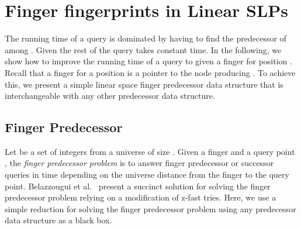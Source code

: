 \documentclass[11pt]{article}
\begin{document}
\section{Finger fingerprints in Linear SLPs}
The  running time of a  query is dominated by having to find the predecessor  of  among . Given  the rest of the query takes constant time. In the following, we show how to improve the running time of a  query to  given a finger for position .  Recall that a finger  for  a position  is a pointer to the node  producing .
To achieve this, we present a simple linear space finger predecessor data structure that is interchangeable with any other predecessor data structure.

\subsection{Finger Predecessor}
Let  be a set of  integers from a universe  of size . Given a finger  and a query point , the \emph{finger predecessor problem} is to answer finger predecessor or successor queries in time depending on the universe distance  from the finger to the query point. Belazzougui et al.~\cite{fingerpred} present a succinct solution for solving the finger predecessor problem relying on a modification of z-fast tries. Here, we use a simple reduction for solving the finger predecessor problem using any predecessor data structure as a black box. 
\end{document}
